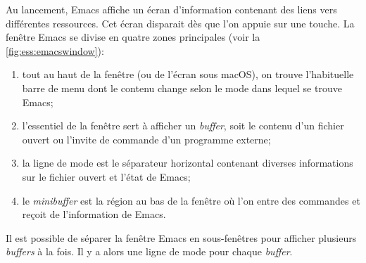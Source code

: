 Au lancement, Emacs affiche un écran d'information contenant des liens
vers différentes ressources. Cet écran disparait dès que l'on appuie
sur une touche. La fenêtre Emacs se divise en quatre zones principales
(voir la \autoref{fig:ess:emacswindow}):
\begin{enumerate}
\item tout au haut de la fenêtre (ou de l'écran sous macOS), on trouve
  l'habituelle barre de menu dont le contenu change selon le mode dans
  lequel se trouve Emacs;
\item l'essentiel de la fenêtre sert à afficher un \emph{buffer}, soit
  le contenu d'un fichier ouvert ou l'invite de commande d'un
  programme externe;
\item la ligne de mode est le séparateur horizontal contenant diverses
  informations sur le fichier ouvert et l'état de Emacs;
\item le \emph{minibuffer} est la région au bas de la fenêtre où l'on
  entre des commandes et reçoit de l'information de Emacs.
\end{enumerate}
Il est possible de séparer la fenêtre Emacs en sous-fenêtres pour
afficher plusieurs \emph{buffers} à la fois. Il y a alors une ligne de
mode pour chaque \emph{buffer}.

